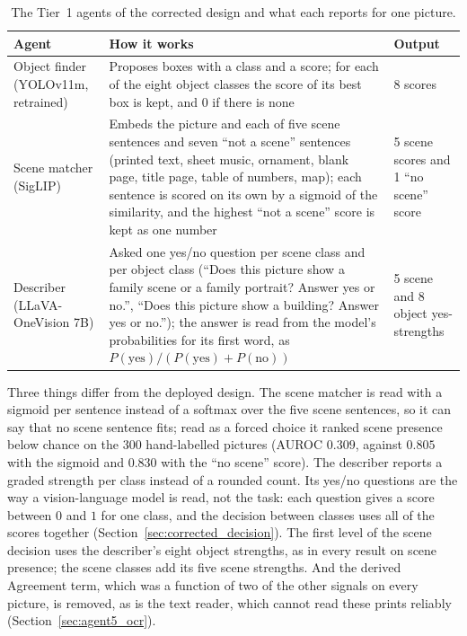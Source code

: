 \begin{table}[!htbp]
\centering
\caption[The Tier~1 agents of the corrected design]{The Tier~1 agents of the corrected design and what each reports for one picture.}
\label{tab:corrected_agents}
\small
\begin{tabular}{p{3.1cm}p{7.4cm}p{3.6cm}}
\toprule
Agent & How it works & Output \\
\midrule
Object finder (YOLOv11m, retrained) & Proposes boxes with a class and a score; for each of the eight object classes the score of its best box is kept, and $0$ if there is none & 8 scores \\
Scene matcher (SigLIP) & Embeds the picture and each of five scene sentences and seven ``not a scene'' sentences (printed text, sheet music, ornament, blank page, title page, table of numbers, map); each sentence is scored on its own by a sigmoid of the similarity, and the highest ``not a scene'' score is kept as one number & 5 scene scores and 1 ``no scene'' score \\
Describer (LLaVA-OneVision 7B) & Asked one yes/no question per scene class and per object class (``Does this picture show a family scene or a family portrait? Answer yes or no.'', ``Does this picture show a building? Answer yes or no.''); the answer is read from the model's probabilities for its first word, as $P(\text{yes})/(P(\text{yes})+P(\text{no}))$ & 5 scene and 8 object yes-strengths \\
\bottomrule
\end{tabular}
\end{table}

Three things differ from the deployed design. The scene matcher is read with a sigmoid per sentence instead of a softmax over the five scene sentences, so it can say that no scene sentence fits; read as a forced choice it ranked scene presence below chance on the 300 hand-labelled pictures (AUROC $0.309$, against $0.805$ with the sigmoid and $0.830$ with the ``no scene'' score). The describer reports a graded strength per class instead of a rounded count. Its yes/no questions are the way a vision-language model is read, not the task: each question gives a score between $0$ and $1$ for one class, and the decision between classes uses all of the scores together (Section~\ref{sec:corrected_decision}). The first level of the scene decision uses the describer's eight object strengths, as in every result on scene presence; the scene classes add its five scene strengths. And the derived Agreement term, which was a function of two of the other signals on every picture, is removed, as is the text reader, which cannot read these prints reliably (Section~\ref{sec:agent5_ocr}).

